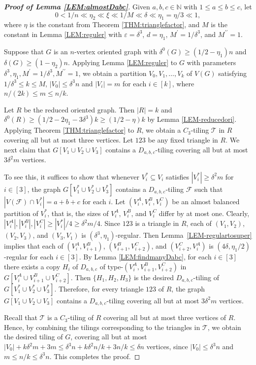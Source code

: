 \documentclass[11pt,a4paper,reqno]{amsart}
\theoremstyle{definition} %
\begin{document}
\begin{proof}[\textbf{Proof of Lemma \ref{LEM:almostDabc}}]
Given $a,b,c\in \mathbb{N}$ with $1\leqslant a\leqslant b \leqslant c$, let
$$0<1/n \ll \eta_2 \ll \xi\ll 1/M \ll \delta \ll \eta_1=\eta/3 \ll 1,$$
where $\eta$ is the constant from Theorem \ref{THM:trianglefactor}, and $M$ is the constant in Lemma \ref{LEM:reguler} with $\varepsilon=\delta^3$, $d=\eta_1$, $M^\prime =1/\delta^3$, and $M^{\prime\prime}=1$.

Suppose that $G$ is an $n$-vertex oriented graph with $\delta^0(G)\geqslant (1/2-\eta_1)n$ and $\delta(G)\geqslant(1-\eta_2)n$. Applying Lemma \ref{LEM:reguler} to $G$ with parameters $\delta^3,\eta_1, M^\prime =1/\delta^3,M^{\prime\prime}=1$, we obtain a partition $V_0,V_1,\ldots,V_k$ of $V(G)$ satisfying  $1/\delta^3\leqslant k\leqslant M$, $|V_0|\leqslant \delta ^3 n$ and $|V_i|=m$ for each $i\in[k]$, where $n/(2k) \leqslant m\leqslant n/k$.

Let $R$ be the reduced oriented graph. Then $|R|=k$ and
$\delta^0(R)\geqslant (1/2-2\eta_1-3\delta^3)k\geqslant (1/2-\eta)k$
by Lemma \ref{LEM-reducedori}. Applying Theorem \ref{THM:trianglefactor} to $R$, we obtain a $C_3$-tiling $\mathcal{T}$ in $R$ covering all but at most three vertices. Let $123$ be any fixed triangle in $R$. We next claim that $G[V_1\cup V_2\cup V_3]$ contains a $D_{a,b,c}$-tiling covering all but at most $3\delta^2m$ vertices. 

To see this, it suffices to show that whenever $V_i^{\ast}\subseteq V_i$ satisfies $|V_i^{\ast}|\geqslant \delta^2m$ for  $i\in[3]$, the graph $G[V_1^{\ast}\cup V_2^{\ast}\cup V_3^{\ast}]$ contains a $D_{a,b,c}$-tiling $\mathcal{F}$ such that $|V(\mathcal{F})\cap V_i^\ast|=a+b+c$ for each $i$. Let $(V_i^A,V_i^B,V_i^C)$ be an almost balanced partition of $V_i^{\ast}$, that is, the sizes of $V_i^A$, $V_i^B$, and $V_i^C$ differ by at most one. Clearly,
$|V_i^A|, |V_i^B|, |V_i^C|\geqslant |V_i^{\ast}|/4\geqslant \delta^2 m/4$.
Since $123$ is a triangle in $R$, each of $(V_1,V_2)$, $(V_2,V_3)$, and $(V_3,V_1)$ is $(\delta^3,\eta_1)$-regular. Then Lemma~\ref{LEM-regulartosuper} implies that each of $(V_i^A,V_{i+1}^B)$, $(V_{i+1}^B,V_{i+2}^C)$, and $(V_{i+2}^C,V_i^A)$ is $(4\delta,\eta_1/2)$-regular for each $i\in[3]$. By Lemma \ref{LEM:findmanyDabc}, for each $i\in[3]$ there exists a copy $H_i$ of $D_{a,b,c}$ of type-$(V_i^A, V_{i+1}^B,V_{i+2}^C)$ in $G[V_i^A\cup V_{i+1}^B\cup V_{i+2}^C]$. Then $\{H_1,H_2,H_3\}$ is the desired $D_{a,b,c}$-tiling of $G[V_1^{\ast}\cup V_2^{\ast}\cup V_3^{\ast}]$. Therefore, for every triangle $123$ of $R$, the graph $G[V_1\cup V_2\cup V_3]$ contains a $D_{a,b,c}$-tiling covering all but at most $3\delta^2m$ vertices.

Recall that $\mathcal{T}$ is a $C_3$-tiling of $R$ covering all but at most three vertices of $R$. Hence, by combining the tilings corresponding to the triangles in $\mathcal{T}$, we obtain the desired tiling of $G$, covering all but at most
$|V_0|+k\delta^2m + 3m \leqslant \delta^3n + k\delta^2 n/k + 3n/k\leqslant \delta n$
vertices, since $|V_0|\leqslant \delta^3 n$ and $m\leqslant n/k \leqslant \delta^3 n$. This completes the proof.
\end{proof}
\end{document}
